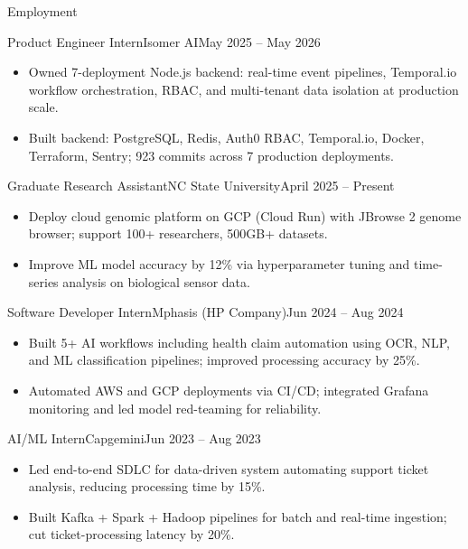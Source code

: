 \documentclass[]{mcdowellcv}
\begin{document}
\makeheader

\begin{cvsection}{Employment}
  \begin{cvsubsection}{Product Engineer Intern}{Isomer AI}{May 2025 -- May 2026}
    \begin{itemize}
      \item Owned 7-deployment Node.js backend: real-time event pipelines, Temporal.io workflow orchestration, RBAC, and multi-tenant data isolation at production scale.
      \item Built backend: PostgreSQL, Redis, Auth0 RBAC, Temporal.io, Docker, Terraform, Sentry; 923 commits across 7 production deployments.
    \end{itemize}
    \vspace{-1.5pt}
  \end{cvsubsection}

  \begin{cvsubsection}{Graduate Research Assistant}{NC State University}{April 2025 -- Present}
    \begin{itemize}
      \item Deploy cloud genomic platform on GCP (Cloud Run) with JBrowse 2 genome browser; support 100+ researchers, 500GB+ datasets.
      \item Improve ML model accuracy by 12\% via hyperparameter tuning and time-series analysis on biological sensor data.
    \end{itemize}
    \vspace{-1.5pt}
  \end{cvsubsection}

  \begin{cvsubsection}{Software Developer Intern}{Mphasis (HP Company)}{Jun 2024 -- Aug 2024}
    \begin{itemize}
      \item Built 5+ AI workflows including health claim automation using OCR, NLP, and ML classification pipelines; improved processing accuracy by 25\%.
      \item Automated AWS and GCP deployments via CI/CD; integrated Grafana monitoring and led model red-teaming for reliability.
    \end{itemize}
    \vspace{-1.5pt}
  \end{cvsubsection}

  \begin{cvsubsection}{AI/ML Intern}{Capgemini}{Jun 2023 -- Aug 2023}
    \begin{itemize}
      \item Led end-to-end SDLC for data-driven system automating support ticket analysis, reducing processing time by 15\%.
      \item Built Kafka + Spark + Hadoop pipelines for batch and real-time ingestion; cut ticket-processing latency by 20\%.
    \end{itemize}
    \vspace{-1.5pt}
  \end{cvsubsection}
\end{cvsection}
\end{document}
